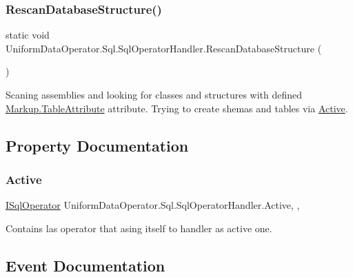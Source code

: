 \subsubsection{\texorpdfstring{Rescan\+Database\+Structure()}{RescanDatabaseStructure()}}
{\footnotesize\ttfamily static void Uniform\+Data\+Operator.\+Sql.\+Sql\+Operator\+Handler.\+Rescan\+Database\+Structure (\begin{DoxyParamCaption}{ }\end{DoxyParamCaption})\hspace{0.3cm}{\ttfamily [static]}}



Scaning assemblies and looking for classes and structures with defined \mbox{\hyperlink{class_uniform_data_operator_1_1_sql_1_1_markup_1_1_table_attribute}{Markup.\+Table\+Attribute}} attribute. Trying to create shemas and tables via \mbox{\hyperlink{class_uniform_data_operator_1_1_sql_1_1_sql_operator_handler_aa96eb9fd201700acbf53954599fec534}{Active}}. 



\subsection{Property Documentation}
\mbox{\label{class_uniform_data_operator_1_1_sql_1_1_sql_operator_handler_aa96eb9fd201700acbf53954599fec534}} 
\subsubsection{\texorpdfstring{Active}{Active}}
{\footnotesize\ttfamily \mbox{\hyperlink{interface_uniform_data_operator_1_1_sql_1_1_i_sql_operator}{I\+Sql\+Operator}} Uniform\+Data\+Operator.\+Sql.\+Sql\+Operator\+Handler.\+Active\hspace{0.3cm}{\ttfamily [static]}, {\ttfamily [get]}, {\ttfamily [set]}}



Contains las operator that asing itself to handler as active one. 



\subsection{Event Documentation}
\mbox{\label{class_uniform_data_operator_1_1_sql_1_1_sql_operator_handler_a8373486df36ace17ffba1e14bf6a951a}} 
